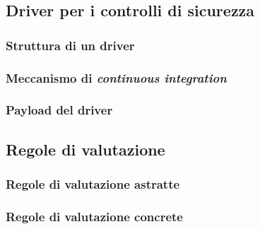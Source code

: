 \documentclass[../main.tex]{subfiles}
\begin{document}
\subsection{Driver per i controlli di sicurezza}
\subsubsection{Struttura di un driver}
\subsubsection{Meccanismo di \textit{continuous integration}}
\subsubsection{Payload del driver}
\subsection{Regole di valutazione}
\subsubsection{Regole di valutazione astratte}
\subsubsection{Regole di valutazione concrete}
\end{document}
